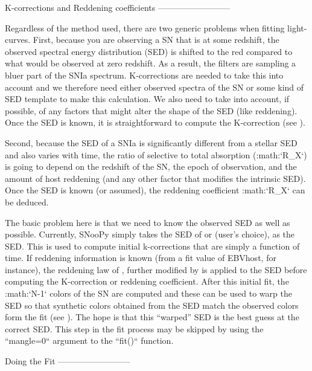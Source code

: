 K-corrections and Reddening coefficients
--------------------------

Regardless of the method used, there are two generic problems when
fitting light-curves. First, because you are observing a SN that is
at some redshift, the observed spectral energy distribution (SED)
is shifted to the red compared to what would be observed at zero redshift.
As a result, the filters are sampling a bluer part of the SNIa spectrum.
K-corrections are needed to take this into account and we therefore
need either observed spectra of the SN or some kind of SED template
to make this calculation. We also need to take into account, if possible,
of any factors that might alter the shape of the SED (like reddening).
Once the SED is known, it is straightforward to compute the K-correction
(see \citet{2002PASP..114..803N,2007ApJ...663.1187H}).

Second, because the SED of a SNIa is significantly different from
a stellar SED and also varies with time, the ratio of selective to
total absorption (:math:`R_{X}`) is going to depend on the redshift of
the SN, the epoch of observation, and the amount of host reddening
(and any other factor that modifies the intrinsic SED). Once the SED
is known (or assumed), the reddening coefficient :math:`R_{X}` can be deduced.

The basic problem here is that we need to know the observed SED as
well as possible. Currently, SNooPy simply takes the SED of \citet{2002PASP..114..803N}
or \citet{2007ApJ...663.1187H} (user's choice), as the SED. This
is used to compute initial k-corrections that are simply a function
of time. If reddening information is known (from a fit value of EBVhost,
for instance), the reddening law of \citet{1989ApJ...345..245C},
further modified by \citet{1994ApJ...422..158O} is applied to the
SED before computing the K-correction or reddening coefficient. After
this initial fit, the :math:`N-1` colors of the SN are computed and these
can be used to warp the SED so that synthetic colors obtained from
the SED match the observed colors form the fit (see \citet{2007ApJ...663.1187H}
). The hope is that this ``warped'' SED is the best guess at the
correct SED. This step in the fit process may be skipped by using
the ``mangle=0`` argument to the ``fit()`` function.


Doing the Fit\label{sub:Doing-the-Fit}
--------------------------


